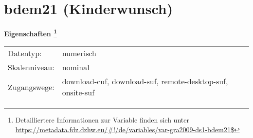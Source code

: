 
    \setcounter{footnote}{0}

    \vspace*{-1.8cm}
	\section{bdem21 (Kinderwunsch)}
	\label{section:bdem21}



    \vspace*{0.5cm}
    \noindent\textbf{Eigenschaften
	\footnote{Detailliertere Informationen zur Variable finden sich unter
		\url{https://metadata.fdz.dzhw.eu/\#!/de/variables/var-gra2009-ds1-bdem21$}}}\\
	\begin{tabularx}{\hsize}{@{}lX}
	Datentyp: & numerisch \\
	Skalenniveau: & nominal \\
	Zugangswege: &
	  download-cuf, 
	  download-suf, 
	  remote-desktop-suf, 
	  onsite-suf
 \\
    \end{tabularx}



